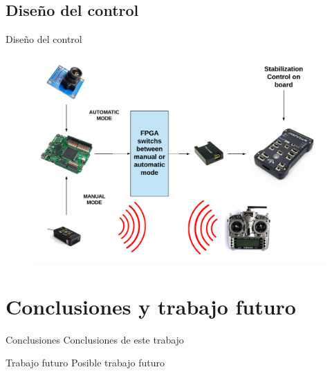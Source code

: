 \documentclass{beamer}
\begin{document}
\subsection{Diseño del control}
\begin{frame}{Diseño del control}
\begin{figure}[H]
	\center
	\includegraphics[trim = 0mm 0cm 0mm 0cm, clip,scale=0.39]{imagenes/Cuadricoptero_vision/control_implementation.pdf}
\end{figure}
\end{frame}
\section{Conclusiones y trabajo futuro}
\begin{frame}{Conclusiones}
Conclusiones de este trabajo
\end{frame}
\begin{frame}{Trabajo futuro}
Posible trabajo futuro
\end{frame}
\end{document}
